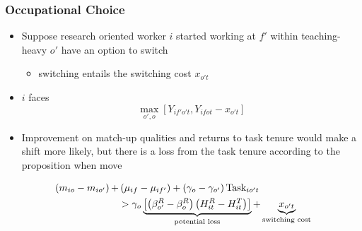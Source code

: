 \documentclass[11pt]{beamer}
\begin{document}
\begin{frame}
	\frametitle{Occupational Choice}
	\begin{itemize}
		\item Suppose research oriented worker $i$ started working at $f'$ within teaching-heavy $o'$ have an option to switch
		\begin{itemize}
			\item switching entails the switching cost $x_{o't}$ 
		\end{itemize}
		\item $i$ faces 
		\begin{equation}
			\max_{o',o} \left[Y_{if'o't}, Y_{ifot}-x_{o't} \right] 
		\end{equation}
		\item Improvement on match-up qualities and returns to task tenure would make a shift more likely, but there is a loss from the task tenure according to the proposition when move
	\end{itemize}
\begin{align}	\label{eq:eq10}
	\left(m_{io}-m_{io'} \right) + &\left( \mu_{if}-\mu_{if'}\right)+\left( \gamma_o-\gamma_{o'}\right) \text{Task}_{io't} \\
	&>\gamma_o\underbrace{\left[ \left( \beta_{o'}^R - \beta_{o}^R \right) \left( H_{it}^R-H_{it}^T\right) \right]}_{\text{potential loss}} +  \underbrace{x_{o't}}_{\text{switching cost}} \notag
\end{align}
	
	
\end{frame}
\end{document}
